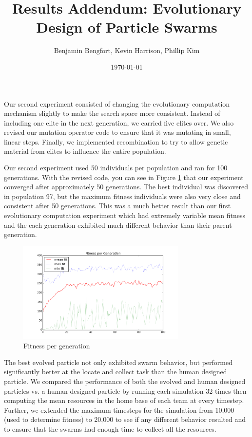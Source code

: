 \documentclass[letter]{article}
\title{Results Addendum: Evolutionary Design of Particle Swarms}
\author{Benjamin Bengfort, Kevin Harrison, Phillip Kim}
\date{\today}
\begin{document}
\maketitle

Our second experiment consisted of changing the evolutionary computation mechanism slightly to make the search space more consistent. Instead of including one elite in the next generation, we carried five elites over. We also revised our mutation operator code to ensure that it was mutating in small, linear steps. Finally, we implemented recombination to try to allow genetic material from elites to influence the entire population. 

Our second experiment used 50 individuals per population and ran for 100 generations. With the revised code, you can see in Figure \ref{fig:meanfit} that our experiment converged after approximately 50 generations. The best individual was discovered in population 97, but the maximum fitness individuals were also very close and consistent after 50 generations. This was a much better result than our first evolutionary computation experiment which had extremely variable mean fitness and the each generation exhibited much different behavior than their parent generation.

\begin{figure}
	\centering
	    \includegraphics[width=0.75\textwidth]{figures/meanfit_experiment2}
    \caption{\label{fig:meanfit}Fitness per generation}
\end{figure}

The best evolved particle not only exhibited swarm behavior, but performed significantly better at the locate and collect task than the human designed particle. We compared the performance of both the evolved and human designed particles vs. a human designed particle by running each simulation 32 times then computing the mean resources in the home base of each team at every timestep. Further, we extended the maximum timesteps for the simulation from 10,000 (used to determine fitness) to 20,000 to see if any different behavior resulted and to ensure that the swarms had enough time to collect all the resources. 
\end{document}
